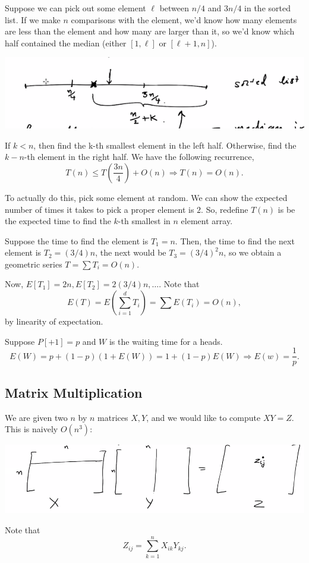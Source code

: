 \documentclass[11pt]{scrartcl}
\begin{document}
Suppose we can pick out some element $\ell$ between $n/4$ and $3n/4$ in the sorted list.  If we make $n$ comparisons with the element, we'd know how many elements are less than the element and how many are larger than it, so we'd know which half contained the median (either $[1, \ell]$ or $[\ell+1, n]$).  
\begin{center}
\includegraphics[scale=1]{median.png}
\end{center}
If $k < n$, then find the k-th smallest element in the left half.  Otherwise, find the $k-n$-th element in the right half.  We have the following recurrence,
$$T(n) \le T(\frac{3n}{4}) + O(n) \Rightarrow T(n) = O(n).$$

To actually do this, pick some element at random.  We can show the expected number of times it takes to pick a proper element is $2$.  So, redefine $T(n)$ is be the expected time to find the $k$-th smallest in $n$ element array.

Suppose the time to find the element is $T_1 = n$. Then, the time to find the next element is $T_2 = (3/4)n$, the next would be $T_3 = (3/4)^2n$, so we obtain a geometric series $T = \sum T_i = O(n)$.

Now, $E[T_1] = 2n, E[T_2] = 2(3/4)n, \dots$.  Note that 
$$E(T) = E(\sum_{i=1}^d T_i) = \sum E(T_i) = O(n),$$
by linearity of expectation.

Suppose $P[+1] = p$ and $W$ is the waiting time for a heads.  $$E(W) = p + (1-p)(1+E(W)) = 1 + (1-p)E(W) \Rightarrow E(w) = \frac{1}{p}.$$

\subsection{Matrix Multiplication}
We are given two $n$ by $n$ matrices $X, Y$, and we would like to compute $XY = Z$.   This is naively $O(n^3)$:
\begin{center}
\includegraphics[scale=.75]{matrix.png}
\end{center}
Note that
$$Z_{ij} = \sum_{k=1}^n X_{ik}Y_{kj}.$$
\end{document}
